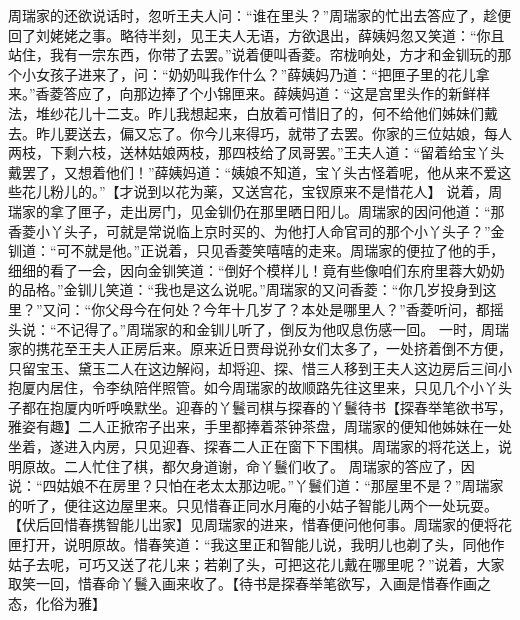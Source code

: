 \documentclass[12pt,oneside]{book}
\begin{document}
周瑞家的还欲说话时，忽听王夫人问：“谁在里头？”周瑞家的忙出去答应了，趁便回了刘姥姥之事。略待半刻，见王夫人无语，方欲退出，薛姨妈忽又笑道：“你且站住，我有一宗东西，你带了去罢。”说着便叫香菱。帘栊响处，方才和金钏玩的那个小女孩子进来了，问：“奶奶叫我作什么？”薛姨妈乃道：“把匣子里的花儿拿来。”香菱答应了，向那边捧了个小锦匣来。薛姨妈道：“这是宫里头作的新鲜样法，堆纱花儿十二支。昨儿我想起来，白放着可惜旧了的，何不给他们姊妹们戴去。昨儿要送去，偏又忘了。你今儿来得巧，就带了去罢。你家的三位姑娘，每人两枝，下剩六枝，送林姑娘两枝，那四枝给了凤哥罢。”王夫人道：“留着给宝丫头戴罢了，又想着他们！”薛姨妈道：“姨娘不知道，宝丫头古怪着呢，他从来不爱这些花儿粉儿的。”【才说到以花为薬，又送宫花，宝钗原来不是惜花人】
说着，周瑞家的拿了匣子，走出房门，见金钏仍在那里晒日阳儿。周瑞家的因问他道：“那香菱小丫头子，可就是常说临上京时买的、为他打人命官司的那个小丫头子？”金钏道：“可不就是他。”正说着，只见香菱笑嘻嘻的走来。周瑞家的便拉了他的手，细细的看了一会，因向金钏笑道：“倒好个模样儿！竟有些像咱们东府里蓉大奶奶的品格。”金钏儿笑道：“我也是这么说呢。”周瑞家的又问香菱：“你几岁投身到这里？”又问：“你父母今在何处？今年十几岁了？本处是哪里人？”香菱听问，都摇头说：“不记得了。”周瑞家的和金钏儿听了，倒反为他叹息伤感一回。
一时，周瑞家的携花至王夫人正房后来。原来近日贾母说孙女们太多了，一处挤着倒不方便，只留宝玉、黛玉二人在这边解闷，却将迎、探、惜三人移到王夫人这边房后三间小抱厦内居住，令李纨陪伴照管。如今周瑞家的故顺路先往这里来，只见几个小丫头子都在抱厦内听呼唤默坐。迎春的丫鬟司棋与探春的丫鬟待书【探春举笔欲书写，雅姿有趣】二人正掀帘子出来，手里都捧着茶钟茶盘，周瑞家的便知他姊妹在一处坐着，遂进入内房，只见迎春、探春二人正在窗下下围棋。周瑞家的将花送上，说明原故。二人忙住了棋，都欠身道谢，命丫鬟们收了。
周瑞家的答应了，因说：“四姑娘不在房里？只怕在老太太那边呢。”丫鬟们道：“那屋里不是？”周瑞家的听了，便往这边屋里来。只见惜春正同水月庵的小姑子智能儿两个一处玩耍。【伏后回惜春携智能儿岀家】见周瑞家的进来，惜春便问他何事。周瑞家的便将花匣打开，说明原故。惜春笑道：“我这里正和智能儿说，我明儿也剃了头，同他作姑子去呢，可巧又送了花儿来；若剃了头，可把这花儿戴在哪里呢？”说着，大家取笑一回，惜春命丫鬟入画来收了。【待书是探春举笔欲写，入画是惜春作画之态，化俗为雅】
\end{document}
